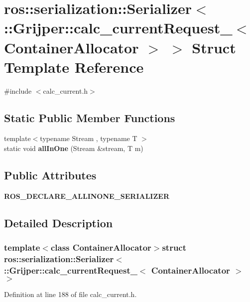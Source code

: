 \section{ros\-:\-:serialization\-:\-:Serializer$<$ \-:\-:Grijper\-:\-:calc\-\_\-current\-Request\-\_\-$<$ Container\-Allocator $>$ $>$ Struct Template Reference}
\label{structros_1_1serialization_1_1Serializer_3_01_1_1Grijper_1_1calc__currentRequest___3_01ContainerAllocator_01_4_01_4}


{\ttfamily \#include $<$calc\-\_\-current.\-h$>$}

\subsection*{Static Public Member Functions}
\begin{DoxyCompactItemize}
\item 
{\footnotesize template$<$typename Stream , typename T $>$ }\\static void {\bf all\-In\-One} (Stream \&stream, T m)
\end{DoxyCompactItemize}
\subsection*{Public Attributes}
\begin{DoxyCompactItemize}
\item 
{\bf R\-O\-S\-\_\-\-D\-E\-C\-L\-A\-R\-E\-\_\-\-A\-L\-L\-I\-N\-O\-N\-E\-\_\-\-S\-E\-R\-I\-A\-L\-I\-Z\-E\-R}
\end{DoxyCompactItemize}


\subsection{Detailed Description}
\subsubsection*{template$<$class Container\-Allocator$>$struct ros\-::serialization\-::\-Serializer$<$ \-::\-Grijper\-::calc\-\_\-current\-Request\-\_\-$<$ Container\-Allocator $>$ $>$}



Definition at line 188 of file calc\-\_\-current.\-h.



